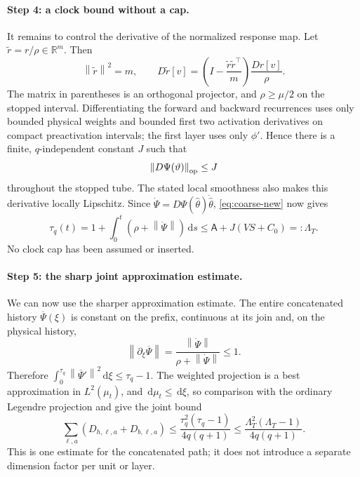 \documentclass[11pt]{article}
\theoremstyle{definition}
\theoremstyle{remark}
\newcommand{\R}{\mathbb{R}}
\newcommand{\norm}[1]{\left\lVert #1\right\rVert}
\newcommand{\dd}{\,\mathrm{d}}
\begin{document}
\paragraph{Step 4: a clock bound without a cap.}
It remains to control the derivative of the normalized response map.  Let
$\tilde r=r/\rho\in\R^m$.  Then
\begin{equation}
 \norm{\tilde r}^2=m,\qquad
 D\tilde r[v]=
 \left(I-\frac{\tilde r\tilde r^\top}{m}\right)\frac{Dr[v]}{\rho}. \label{eq:normalized-residual-derivative}
\end{equation}
The matrix in parentheses is an orthogonal projector, and $\rho\ge\mu/2$ on the
stopped interval.  Differentiating the forward and backward recurrences uses
only bounded physical weights and bounded first two activation derivatives on
compact preactivation intervals; the first layer uses only $\phi'$.  Hence
there is a finite, $q$-independent constant $J$ such that
\[
 \norm{D\Psi(\vartheta)}_{\rm op}\le J
\]
throughout the stopped tube.  The stated local smoothness also makes this
derivative locally Lipschitz.  Since
$\dot\Psi=D\Psi(\widehat\theta)\dot{\widehat\theta}$, \eqref{eq:coarse-new}
now gives
\begin{equation}
 \tau_q(t)=1+\int_0^t(\rho+\norm{\dot\Psi})\dd s
 \le\mathsf A+J(VS+C_0)=:\Lambda_T.                 \label{eq:new-clock-bound}
\end{equation}
No clock cap has been assumed or inserted.

\paragraph{Step 5: the sharp joint approximation estimate.}
We can now use the sharper approximation estimate.  The entire concatenated
history $\overline\Psi(\xi)$ is constant on the prefix, continuous at its join
and, on the physical history,
\[
 \norm{\partial_\xi\overline\Psi}
 =\frac{\norm{\dot\Psi}}{\rho+\norm{\dot\Psi}}\le1.
\]
Therefore $\int_0^{\tau_q}\norm{\overline\Psi'}^2\dd\xi\le \tau_q-1$.  The weighted
projection is a best approximation in $L^2(\mu_t)$, and $\dd\mu_t\le\dd\xi$, so
comparison with the ordinary Legendre projection and  give
the joint bound
\begin{equation}
 \sum_{\ell,a}(D_{h,\ell,a}+D_{b,\ell,a})
 \le\frac{\tau_q^2(\tau_q-1)}{4q(q+1)}
 \le\frac{\Lambda_T^2(\Lambda_T-1)}{4q(q+1)}.       \label{eq:new-joint-tail}
\end{equation}
This is one estimate for the concatenated path; it does not introduce a
separate dimension factor per unit or layer.
\end{document}
